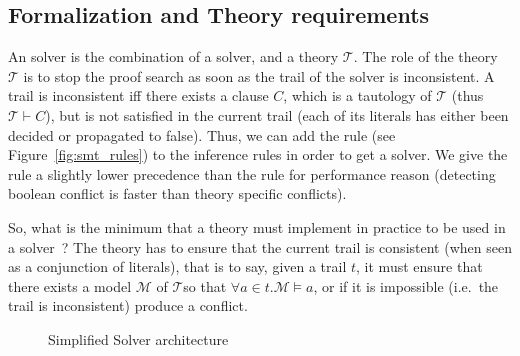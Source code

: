 \documentclass{article}
\begin{document}
\subsection{Formalization and Theory requirements}

An \smt{} solver is the combination of a \sat{} solver, and a theory $\mathcal{T}$.
The role of the theory $\mathcal{T}$ is to stop the proof search as soon as the trail
of the \sat{} solver is inconsistent. A trail is inconsistent iff there exists a clause
$C$, which is a tautology of $\mathcal{T}$ (thus $\mathcal{T} \vdash C$), but is not
satisfied in the current trail (each of its literals has either been decided or
propagated to false). Thus, we can add the  rule (see
Figure~\ref{fig:smt_rules}) to the \cdcl{} inference rules in order to get a \smt{} solver.
We give the  rule a slightly lower precedence than the
 rule for performance reason (detecting boolean conflict is
faster than theory specific conflicts).

So, what is the minimum that a theory must implement in practice to be used in a
\smt{} solver~? The theory has to ensure that the current trail is consistent
(when seen as a conjunction of literals), that is to say, given a trail $t$,
it must ensure that there exists a model $\mathcal{M}$ of $\mathcal{T} $so that
$\forall a \in t. \mathcal{M} \vDash a$, or if it is impossible (i.e.~the trail
is inconsistent) produce a conflict.

\begin{figure}
  \begin{center}
  \end{center}
  \caption{Simplified \smt{} Solver architecture}\label{fig:smt_flow}
\end{figure}
\end{document}
